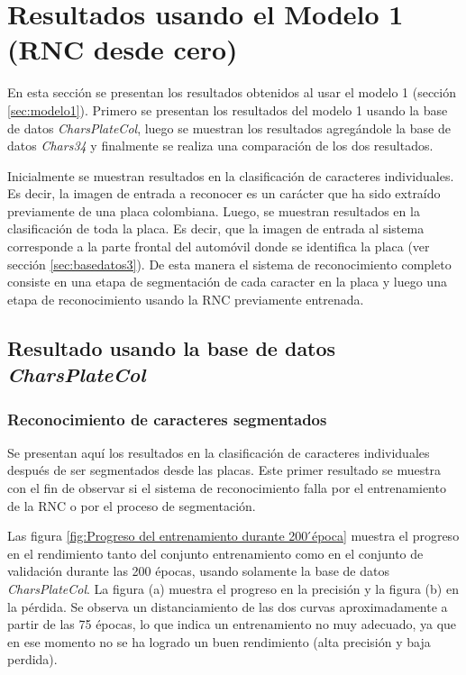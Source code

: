 \chapter{Resultados usando el Modelo 1\\
(RNC desde cero)}

En esta sección se presentan los resultados obtenidos al usar el modelo 1 (\ver sección \ref{sec:modelo1}). Primero se presentan los resultados del modelo 1 usando la base de datos \textit{CharsPlateCol}, luego se muestran los resultados agregándole la base de datos \textit{Chars34} y finalmente se realiza una comparación de los dos resultados.

Inicialmente se muestran resultados en la clasificación de caracteres individuales. Es decir, la imagen de entrada a reconocer es un carácter que ha sido extraído previamente de una placa colombiana. Luego, se muestran resultados en la clasificación de toda la placa. Es decir, que la imagen de entrada al sistema corresponde a la parte frontal del automóvil donde se identifica la placa (ver sección \ref{sec:basedatos3}). De esta manera el sistema de reconocimiento completo consiste en una etapa de segmentación de cada caracter en la placa y luego una etapa de reconocimiento usando la RNC previamente entrenada.  

\section{Resultado usando la base de datos\\
\textit{CharsPlateCol}}

\subsection{Reconocimiento de caracteres segmentados}

Se presentan aquí los resultados en la clasificación de caracteres individuales después de ser segmentados desde las placas. Este primer resultado se muestra con el fin de observar si el sistema de reconocimiento falla por el entrenamiento de la RNC o por el proceso de segmentación.  

Las figura \ref{fig:Progreso del entrenamiento durante 200  ́época} muestra el progreso en el rendimiento tanto del conjunto entrenamiento como en el conjunto de validación durante las 200 épocas, usando solamente la base de datos \textit{CharsPlateCol}. La figura (a) muestra el progreso en la precisión y la figura (b) en la pérdida. Se observa un distanciamiento de las dos curvas aproximadamente a partir de las 75 épocas, lo que indica un entrenamiento no muy adecuado, ya que en ese momento no se ha logrado un buen rendimiento (alta precisión y baja perdida). 

